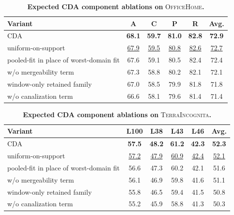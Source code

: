 \documentclass[10pt]{article}
\newcommand{\data}[1]{\textsc{#1}}
\newcommand{\Expected}[1]{#1}
\newcommand{\Best}[1]{\textbf{\Expected{#1}}}
\newcommand{\Second}[1]{\underline{\Expected{#1}}}
\begin{document}
\begin{table}[H]
\centering
\small
\renewcommand{\arraystretch}{1.08}
\caption{\textbf{Expected CDA component ablations on} \data{OfficeHome}\textbf{.}}
\label{tab:cda_officehome_ablation_expected}
\setlength{\tabcolsep}{4pt}
\begin{tabular}{lccccc}
\toprule
\textbf{Variant} & \textbf{A} & \textbf{C} & \textbf{P} & \textbf{R} & \textbf{Avg.} \\
\midrule
CDA & \Best{68.1} & \Best{59.7} & \Best{81.0} & \Best{82.8} & \Best{72.9} \\
uniform-on-support & \Second{67.9} & \Second{59.5} & \Second{80.8} & \Second{82.6} & \Second{72.7} \\
pooled-fit in place of worst-domain fit & \Expected{67.6} & \Expected{59.1} & \Expected{80.5} & \Expected{82.4} & \Expected{72.4} \\
w/o mergeability term & \Expected{67.3} & \Expected{58.8} & \Expected{80.2} & \Expected{82.1} & \Expected{72.1} \\
window-only retained family & \Expected{67.0} & \Expected{58.5} & \Expected{79.9} & \Expected{81.8} & \Expected{71.8} \\
w/o canalization term & \Expected{66.6} & \Expected{58.1} & \Expected{79.6} & \Expected{81.4} & \Expected{71.4} \\
\bottomrule
\end{tabular}
\end{table}

\begin{table}[H]
\centering
\small
\renewcommand{\arraystretch}{1.08}
\caption{\textbf{Expected CDA component ablations on} \data{TerraIncognita}\textbf{.}}
\label{tab:cda_terrainc_ablation_expected}
\setlength{\tabcolsep}{4pt}
\begin{tabular}{lccccc}
\toprule
\textbf{Variant} & \textbf{L100} & \textbf{L38} & \textbf{L43} & \textbf{L46} & \textbf{Avg.} \\
\midrule
CDA & \Best{57.5} & \Best{48.2} & \Best{61.2} & \Best{42.3} & \Best{52.3} \\
uniform-on-support & \Second{57.2} & \Second{47.9} & \Second{60.9} & \Second{42.4} & \Second{52.1} \\
pooled-fit in place of worst-domain fit & \Expected{56.6} & \Expected{47.3} & \Expected{60.2} & \Expected{42.1} & \Expected{51.6} \\
w/o mergeability term & \Expected{56.1} & \Expected{46.9} & \Expected{59.8} & \Expected{41.6} & \Expected{51.1} \\
window-only retained family & \Expected{55.8} & \Expected{46.5} & \Expected{59.4} & \Expected{41.5} & \Expected{50.8} \\
w/o canalization term & \Expected{55.2} & \Expected{45.9} & \Expected{58.8} & \Expected{41.3} & \Expected{50.3} \\
\bottomrule
\end{tabular}
\end{table}
\end{document}
